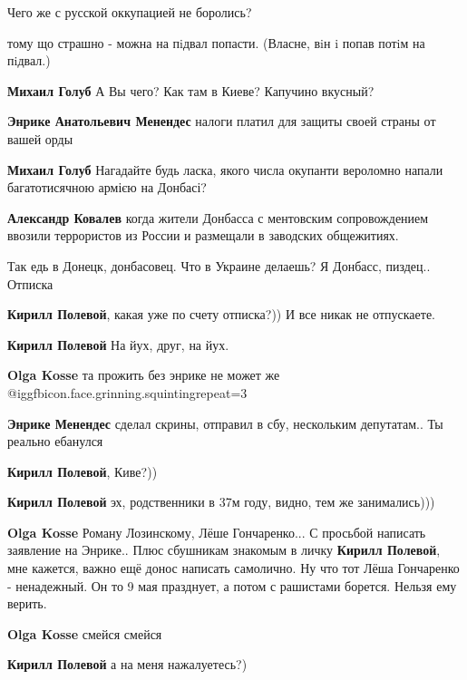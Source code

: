 \begin{itemize}
Чего же с русской оккупацией не боролись?

\begin{itemize} %
тому що страшно - можна на пiдвал попасти. (Власне, вiн i попав потiм на пiдвал.)


\textbf{Михаил Голуб} А Вы чего? Как там в Киеве? Капучино вкусный?

\textbf{Энрике Анатольевич Менендес} налоги платил для защиты своей страны от вашей орды

\textbf{Михаил Голуб} Нагадайте будь ласка, якого числа окупанти вероломно напали багатотисячною армією на Донбасі?

\textbf{Александр Ковалев} когда жители Донбасса с ментовским сопровождением ввозили террористов из России и размещали в заводских общежитиях.
\end{itemize} %


Так едь в Донецк, донбасовец. Что в Украине делаешь? Я Донбасс, пиздец..
Отписка

\begin{itemize} %
\textbf{Кирилл Полевой}, какая уже по счету отписка?)) И все никак не отпускаете.


\textbf{Кирилл Полевой} На йух, друг, на йух.

\textbf{Olga Kosse} та прожить без энрике не может же  @igg{fbicon.face.grinning.squinting}{repeat=3} 

\textbf{Энрике Менендес} сделал скрины, отправил в сбу, нескольким депутатам.. Ты реально ебанулся

\textbf{Кирилл Полевой}, Киве?))

\textbf{Кирилл Полевой} эх, родственники в 37м году, видно, тем же занимались)))

\textbf{Olga Kosse} Роману Лозинскому, Лёше Гончаренко... С просьбой написать заявление на Энрике.. Плюс сбушникам знакомым в личку
\textbf{Кирилл Полевой}, мне кажется, важно ещё донос написать самолично. Ну что тот Лёша Гончаренко - ненадежный. Он то 9 мая празднует, а потом с рашистами борется. Нельзя ему верить.

\textbf{Olga Kosse} смейся смейся

\textbf{Кирилл Полевой} а на меня нажалуетесь?)


\end{itemize}
\end{itemize}
